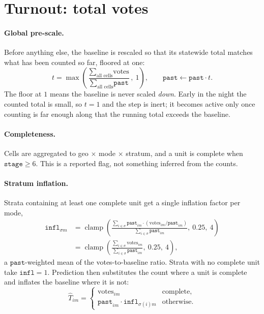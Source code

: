 \documentclass[11pt]{article}
\newcommand{\var}[1]{\texttt{#1}}
\newcommand{\clamp}{\operatorname{clamp}}
\begin{document}
\section{Turnout: total votes}

\paragraph{Global pre-scale.} Before anything else, the baseline is rescaled so that its
statewide total matches what has been counted so far, floored at one:
\begin{equation}
  t = \max\!\left(\frac{\sum_{\text{all cells}} \text{votes}}{\sum_{\text{all cells}} \var{past}},\ 1\right),
  \qquad
  \var{past} \leftarrow \var{past} \cdot t .
  \label{eq:prescale}
\end{equation}
The floor at $1$ means the baseline is never scaled \emph{down}. Early in the night the
counted total is small, so $t = 1$ and the step is inert; it becomes active only once
counting is far enough along that the running total exceeds the baseline.

\paragraph{Completeness.} Cells are aggregated to
geo $\times$ mode $\times$ stratum, and a unit is complete when
$\var{stage} \geq 6$. This is a reported flag, not something inferred from the counts.

\paragraph{Stratum inflation.} Strata containing at least one complete unit get a single
inflation factor per mode,
\begin{equation}
  \begin{aligned}
  \var{infl}_{\sigma m}
    &= \clamp\!\left(
      \frac{\sum_{i \in \sigma} \var{past}_{im} \cdot (\text{votes}_{im} / \var{past}_{im})}
           {\sum_{i \in \sigma} \var{past}_{im}},\ 0.25,\ 4
    \right) \\[4pt]
    &= \clamp\!\left(
      \frac{\sum_{i \in \sigma} \text{votes}_{im}}{\sum_{i \in \sigma} \var{past}_{im}},\ 0.25,\ 4
    \right),
  \end{aligned}
  \label{eq:infl}
\end{equation}
a $\var{past}$-weighted mean of the votes-to-baseline ratio. Strata with no complete unit
take $\var{infl} = 1$. Prediction then substitutes the count where a unit is complete and
inflates the baseline where it is not:
\begin{equation}
  \widehat{T}_{im} =
  \begin{cases}
    \text{votes}_{im} & \text{complete,}\\
    \var{past}_{im} \cdot \var{infl}_{\sigma(i) m} & \text{otherwise.}
  \end{cases}
  \label{eq:predtot}
\end{equation}
\end{document}
